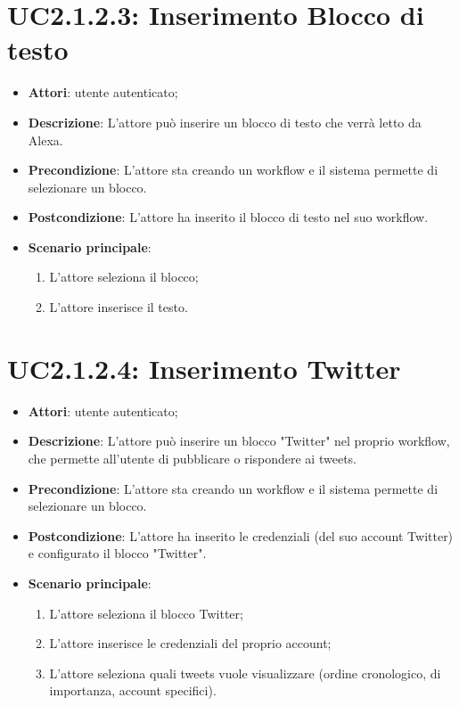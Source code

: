 \section{UC2.1.2.3: Inserimento Blocco di testo}
\label{UC2.1.2.3}
\begin{itemize}
	\item \textbf{Attori}: utente autenticato;
	\item \textbf{Descrizione}: L'attore può inserire un blocco di testo che verrà letto da Alexa.
	\item \textbf{Precondizione}: L'attore sta creando un workflow e il sistema permette di selezionare un blocco.
	\item \textbf{Postcondizione}: L'attore ha inserito il blocco di testo nel suo workflow.
	\item \textbf{Scenario principale}:
	\begin{enumerate} \item L'attore seleziona il blocco;  \item  L'attore inserisce il testo.\end{enumerate}
\end{itemize}

\section{UC2.1.2.4: Inserimento Twitter}
\label{UC2.1.2.4}
\begin{itemize}
	\item \textbf{Attori}: utente autenticato;
	\item \textbf{Descrizione}: L'attore può inserire un blocco "Twitter" nel proprio workflow, che permette all'utente di pubblicare o rispondere ai tweets.
	\item \textbf{Precondizione}: L'attore sta creando un workflow e il sistema permette di selezionare un blocco.
	\item \textbf{Postcondizione}: L'attore ha inserito le credenziali (del suo account Twitter) e configurato il blocco "Twitter".
	\item \textbf{Scenario principale}:
	\begin{enumerate} \item L'attore seleziona il blocco Twitter;  \item  L'attore inserisce le credenziali del proprio account;  \item  L'attore seleziona quali tweets vuole visualizzare (ordine cronologico, di importanza, account specifici).\end{enumerate}
\end{itemize}


